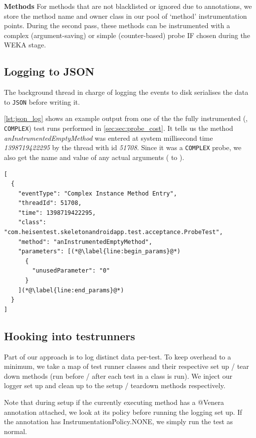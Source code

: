 \textbf{Methods} For methods that are not blacklisted or ignored due to
annotations, we store the method name and owner class in our pool of
{\lq}method{\rq} instrumentation points. During the second pass, these methods
can be instrumented with a complex (argument-saving) or simple (counter-based)
probe IF chosen during the WEKA stage.

\subsection{Logging to JSON}

The background thread in charge of logging the events to disk serialises the
data to {\tt JSON} before writing it.

\autoref{lst:json_log} shows an example output from one of the the fully
instrumented (\ie, {\tt COMPLEX}) test runs performed in
\autoref{sec:sec:probe_cost}. It tells us the method
\textit{anInstrumentedEmptyMethod} was entered at system millisecond time
\textit{1398719422295} by the thread with id \textit{51708}. Since it was a
{\tt COMPLEX} probe, we also get the name and value of any actual arguments
( to ).

\begin{lstlisting}[label=lst:json_log]
[
  {
    "eventType": "Complex Instance Method Entry",
    "threadId": 51708,
    "time": 1398719422295,
    "class": "com.heisentest.skeletonandroidapp.test.acceptance.ProbeTest",
    "method": "anInstrumentedEmptyMethod",
    "parameters": [(*@\label{line:begin_params}@*)
      {
        "unusedParameter": "0"
      }
    ](*@\label{line:end_params}@*)
  }
]
\end{lstlisting}

\subsection{Hooking into testrunners}

Part of our approach is to log distinct data per-test. To keep overhead to a
minimum, we take a map of test runner classes and their respective set up / tear
down methods (run before / after each test in a class is run). We inject our
logger set up and clean up to the setup / teardown methods respectively.

Note that during setup if the currently executing method has a @Venera
annotation attached, we look at its policy before running the logging set up. If
the annotation has InstrumentationPolicy.NONE, we simply run the test as normal.

